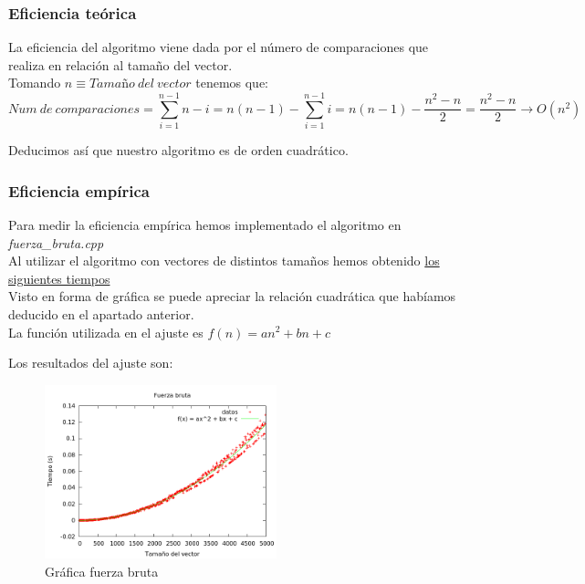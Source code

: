 \subsubsection{Eficiencia teórica}
La eficiencia del algoritmo viene dada por el número de comparaciones que realiza en relación al tamaño del vector.\\

Tomando $n \equiv Tamaño\ del\ vector$ tenemos que:\\

$$Num\ de\ comparaciones = \sum_{i=1}^{n-1}n-i = n(n-1) - \sum_{i=1}^{n-1}i = n(n-1) - \frac{n^2 - n}{2} = \frac{n^2 - n}{2} \longrightarrow O(n^2)$$

Deducimos así que nuestro algoritmo es de orden cuadrático.\\

\subsubsection{Eficiencia empírica}
Para medir la eficiencia empírica hemos implementado el algoritmo en \textit{fuerza\_bruta.cpp}\\

Al utilizar el algoritmo con vectores de distintos tamaños hemos obtenido \hyperref[tabla_comp]{{\color{blue} los siguientes tiempos}}\\

Visto en forma de gráfica se puede apreciar la relación cuadrática que habíamos deducido en el apartado anterior.\\

La función utilizada en el ajuste es $f(n) = an^2 + bn + c$

Los resultados del ajuste son:\\

\begin{center}
\end{center}


\begin{figure}[h]
\centering
	\includegraphics[width=0.6\textwidth]{../Opcional/Graficas/fuerza_bruta_bruno.png}
	\caption{Gráfica fuerza bruta} 
	\label{fig:perros} 
\end{figure}

